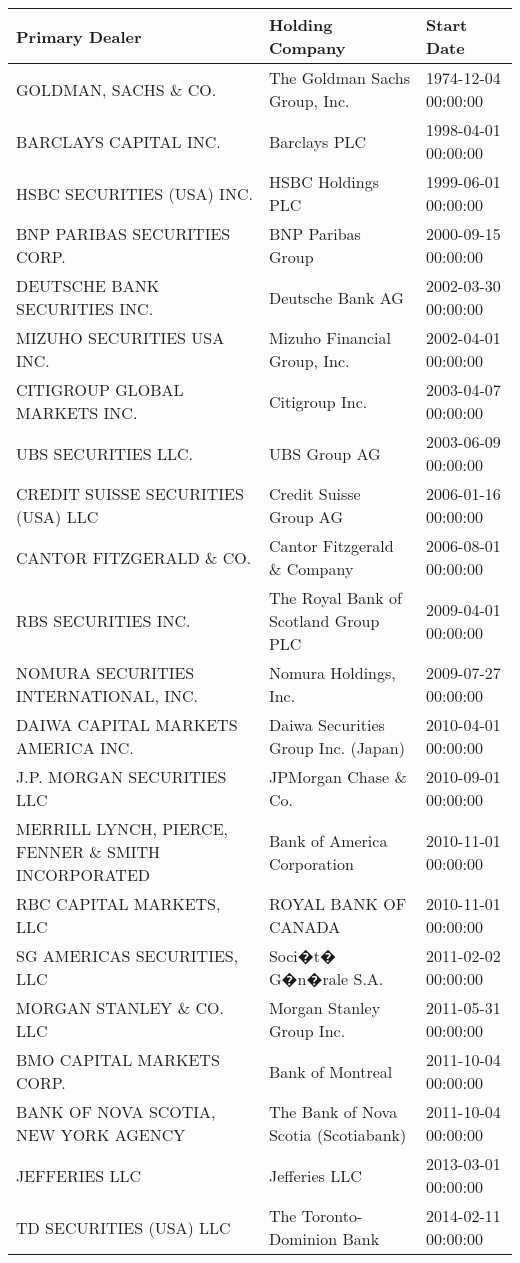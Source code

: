 \begin{tabular}{lll}
\toprule
Primary Dealer & Holding Company & Start Date \\
\midrule
GOLDMAN, SACHS \& CO.                & The Goldman Sachs Group, Inc. & 1974-12-04 00:00:00 \\
BARCLAYS CAPITAL INC.               & Barclays PLC & 1998-04-01 00:00:00 \\
HSBC SECURITIES (USA) INC.          & HSBC Holdings PLC & 1999-06-01 00:00:00 \\
BNP PARIBAS SECURITIES CORP.     & BNP Paribas Group & 2000-09-15 00:00:00 \\
DEUTSCHE BANK SECURITIES INC.    & Deutsche Bank AG & 2002-03-30 00:00:00 \\
MIZUHO SECURITIES USA INC.       & Mizuho Financial Group, Inc. & 2002-04-01 00:00:00 \\
CITIGROUP GLOBAL MARKETS INC.    & Citigroup Inc. & 2003-04-07 00:00:00 \\
UBS SECURITIES LLC.                 & UBS Group AG & 2003-06-09 00:00:00 \\
CREDIT SUISSE SECURITIES (USA) LLC     & Credit Suisse Group AG & 2006-01-16 00:00:00 \\
CANTOR FITZGERALD \& CO. & Cantor Fitzgerald \& Company & 2006-08-01 00:00:00 \\
RBS SECURITIES INC. & The Royal Bank of Scotland Group PLC & 2009-04-01 00:00:00 \\
NOMURA SECURITIES INTERNATIONAL, INC. & Nomura Holdings, Inc. & 2009-07-27 00:00:00 \\
DAIWA CAPITAL MARKETS AMERICA INC.   & Daiwa Securities Group Inc. (Japan) & 2010-04-01 00:00:00 \\
J.P. MORGAN SECURITIES LLC         & JPMorgan Chase \& Co. & 2010-09-01 00:00:00 \\
MERRILL LYNCH, PIERCE, FENNER \& SMITH INCORPORATED & Bank of America Corporation & 2010-11-01 00:00:00 \\
RBC CAPITAL MARKETS, LLC & ROYAL BANK OF CANADA & 2010-11-01 00:00:00 \\
SG AMERICAS SECURITIES, LLC & Soci�t� G�n�rale S.A. & 2011-02-02 00:00:00 \\
MORGAN STANLEY \& CO. LLC & Morgan Stanley Group Inc. & 2011-05-31 00:00:00 \\
BMO CAPITAL MARKETS CORP.  & Bank of Montreal & 2011-10-04 00:00:00 \\
BANK OF NOVA SCOTIA, NEW YORK AGENCY & The Bank of Nova Scotia (Scotiabank) & 2011-10-04 00:00:00 \\
JEFFERIES LLC & Jefferies LLC & 2013-03-01 00:00:00 \\
TD SECURITIES (USA) LLC & The Toronto-Dominion Bank & 2014-02-11 00:00:00 \\
\bottomrule
\end{tabular}
